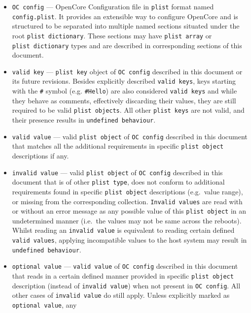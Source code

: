 \documentclass[]{article}
\begin{document}
\begin{itemize}

\item
  \texttt{OC\ config} --- OpenCore Configuration file in \texttt{plist}
  format named \texttt{config.plist}. It provides an extensible way
  to configure OpenCore and is structured to be separated into multiple
  named sections situated under the root \texttt{plist\ dictionary}. These
  sections may have \texttt{plist\ array} or
  \texttt{plist\ dictionary} types and are described in corresponding
  sections of this document.
\item
  \texttt{valid\ key} --- \texttt{plist\ key} object of
  \texttt{OC\ config} described in this document or its future
  revisions. Besides explicitly described \texttt{valid\ keys}, keys
  starting with the \texttt{\#} symbol (e.g. \texttt{\#Hello}) are also
  considered \texttt{valid\ keys} and while they behave as comments, effectively
  discarding their values, they are still required to be valid
  \texttt{plist\ objects}. All other \texttt{plist\ keys} are not valid,
  and their presence results in \texttt{undefined\ behaviour}.
\item
  \texttt{valid\ value} --- valid \texttt{plist\ object} of
  \texttt{OC\ config} described in this document that matches all the
  additional requirements in specific \texttt{plist\ object} descriptions
  if any.
\item
  \texttt{invalid\ value} --- valid \texttt{plist\ object} of
  \texttt{OC\ config} described in this document that is of other
  \texttt{plist\ type}, does not conform to additional requirements
  found in specific \texttt{plist\ object} descriptions (e.g.~value
  range), or missing from the corresponding collection.
  \texttt{Invalid\ values} are read with or without an error message as
  any possible value of this \texttt{plist\ object} in an undetermined
  manner (i.e.~the values may not be same across the reboots). Whilst
  reading an \texttt{invalid\ value} is equivalent to reading certain
  defined \texttt{valid\ values}, applying incompatible values to the host
  system may result in \texttt{undefined\ behaviour}.
\item
  \texttt{optional\ value} --- \texttt{valid\ value} of
  \texttt{OC\ config} described in this document that reads in a certain
  defined manner provided in specific \texttt{plist\ object} description
  (instead of \texttt{invalid\ value}) when not present in
  \texttt{OC\ config}. All other cases of \texttt{invalid\ value} do
  still apply. Unless explicitly marked as \texttt{optional\ value}, any

\end{itemize}
\end{document}
